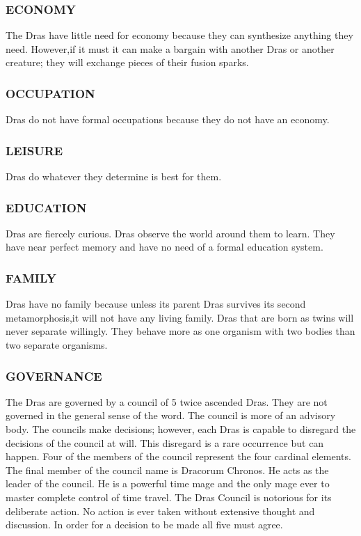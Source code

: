\subsubsection{ECONOMY}
The Dras have little need for economy because they can synthesize anything they
need.  However,if it must it can make a bargain with another Dras or another
creature; they will exchange pieces of their fusion sparks.
\subsubsection{OCCUPATION}
Dras do not have formal occupations because they do not have an economy.
\subsubsection{LEISURE}
Dras do whatever they determine is best for them.
\subsubsection{EDUCATION}
Dras are fiercely curious.  Dras observe the world around them to learn.  They
have near perfect memory and have no need of a formal education system.
\subsubsection{FAMILY}
Dras have no family because unless its parent Dras survives its second
metamorphosis,it will not have any living family.  Dras that are born as twins
will never separate willingly.  They behave more as one organism with two
bodies than two separate organisms.
\subsubsection{GOVERNANCE}
The Dras are governed by a council of 5 twice ascended Dras.  They are not
governed in the general sense of the word.  The council is more of an advisory
body.  The councils make decisions; however, each Dras is capable to disregard
the decisions of the council at will.  This disregard is a rare occurrence but
can happen.  Four of the members of the council represent the four cardinal
elements.  The final member of the council name is Dracorum Chronos.  He acts
as the leader of the council.  He is a powerful time mage and the only mage
ever to master complete control of time travel. The Dras Council is notorious
for its deliberate action.  No action is ever taken without extensive thought
and discussion.  In order for a decision to be made all five must agree.  
